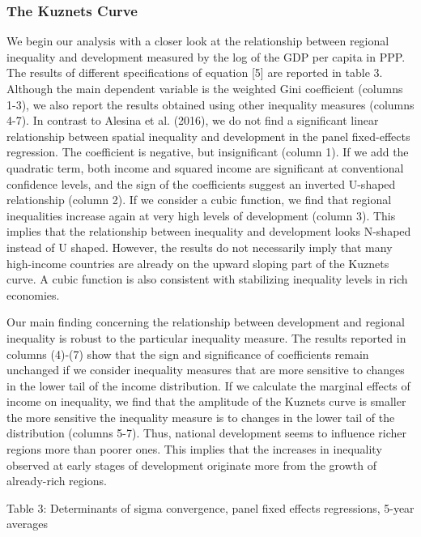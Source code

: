 \documentclass[10pt]{article}
\begin{document}
\subsubsection{The Kuznets Curve}
We begin our analysis with a closer look at the relationship between regional inequality and development measured by the log of the GDP per capita in PPP. The results of different specifications of equation [5] are reported in table 3. Although the main dependent variable is the weighted Gini coefficient (columns 1-3), we also report the results obtained using other inequality measures (columns 4-7). In contrast to Alesina et al. (2016), we do not find a significant linear relationship between spatial inequality and development in the panel fixed-effects regression. The coefficient is negative, but insignificant (column 1). If we add the quadratic term, both income and squared income are significant at conventional confidence levels, and the sign of the coefficients suggest an inverted U-shaped relationship (column 2). If we consider a cubic function, we find that regional inequalities increase again at very high levels of development (column 3). This implies that the relationship between inequality and development looks N-shaped instead of $\mathrm{U}$ shaped. However, the results do not necessarily imply that many high-income countries are already on the upward sloping part of the Kuznets curve. A cubic function is also consistent with stabilizing inequality levels in rich economies.

Our main finding concerning the relationship between development and regional inequality is robust to the particular inequality measure. The results reported in columns (4)-(7) show that the sign and significance of coefficients remain unchanged if we consider inequality measures that are more sensitive to changes in the lower tail of the income distribution. If we calculate the marginal effects of income on inequality, we find that the amplitude of the Kuznets curve is smaller the more sensitive the inequality measure is to changes in the lower tail of the distribution (columns 5-7). Thus, national development seems to influence richer regions more than poorer ones. This implies that the increases in inequality observed at early stages of development originate more from the growth of already-rich regions.

Table 3: Determinants of sigma convergence, panel fixed effects regressions, 5-year averages
\end{document}

